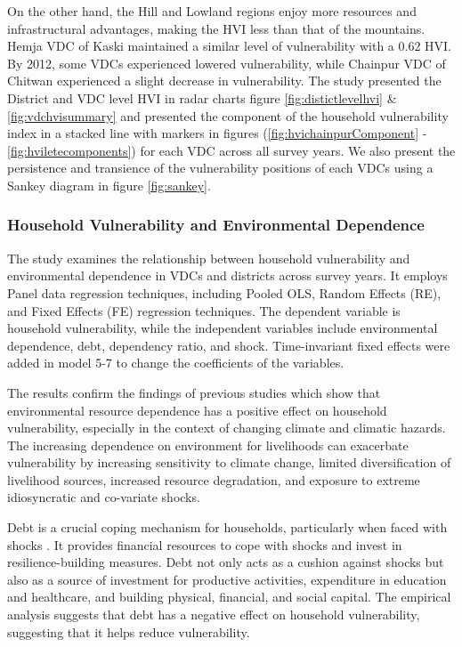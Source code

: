 On the other hand, the Hill and Lowland regions enjoy more resources and infrastructural advantages, making the HVI less than that of the mountains. Hemja VDC of Kaski maintained a similar level of vulnerability with a 0.62 HVI. By 2012, some VDCs experienced lowered vulnerability, while Chainpur VDC of Chitwan experienced a slight decrease in vulnerability. The study presented the District and VDC level HVI in radar charts figure \ref{fig:distictlevelhvi} \& \ref{fig:vdchvisummary} and presented the component of the household vulnerability index in a stacked line with markers in figures (\ref{fig:hvichainpurComponent} - \ref{fig:hviletecomponents}) for each VDC across all survey years. We also present the persistence and transience of the vulnerability positions of each VDCs using a Sankey diagram in figure \ref{fig:sankey}. 

\subsubsection{Household Vulnerability and Environmental Dependence}
The study examines the relationship between household vulnerability and environmental dependence in VDCs and districts across survey years. It employs Panel data regression techniques, including Pooled OLS, Random Effects (RE), and Fixed Effects (FE) regression techniques. The dependent variable is household vulnerability, while the independent variables include environmental dependence, debt, dependency ratio, and shock. Time-invariant fixed effects were added in model 5-7 to change the coefficients of the variables.

The results confirm the findings of previous studies \citep{angelsen2015environmental, abbas2018sustainable, gentle2014differential} which show that environmental resource dependence has a positive effect on household vulnerability, especially in the context of changing climate and climatic hazards. The increasing dependence on environment for livelihoods can exacerbate vulnerability by increasing sensitivity to climate change, limited diversification of livelihood sources, increased resource degradation, and exposure to extreme idiosyncratic and co-variate shocks.

Debt is a crucial coping mechanism for households, particularly when faced with shocks \citep{rabbani2021role}. It provides financial resources to cope with shocks and invest in resilience-building measures. Debt not only acts as a cushion against shocks but also as a source of investment for productive activities, expenditure in education and healthcare, and building physical, financial, and social capital. The empirical analysis suggests that debt has a negative effect on household vulnerability, suggesting that it helps reduce vulnerability.

